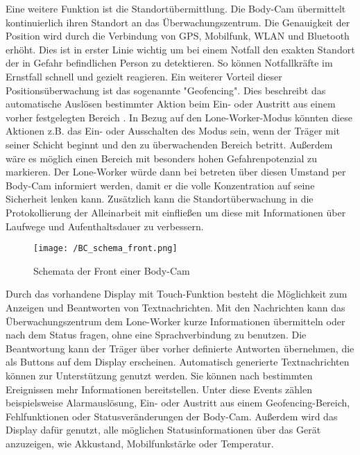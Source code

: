 \documentclass[thesis.tex]{subfiles}
\begin{document}
Eine weitere Funktion ist die Standortübermittlung.
Die Body-Cam übermittelt kontinuierlich ihren Standort an das Überwachungszentrum.
Die Genauigkeit der Position wird durch die Verbindung von GPS, Mobilfunk, WLAN und Bluetooth erhöht.
Dies ist in erster Linie wichtig um bei einem Notfall den exakten Standort der in Gefahr befindlichen Person zu detektieren.
So können Notfallkräfte im Ernstfall schnell und gezielt reagieren.
Ein weiterer Vorteil dieser Positionsüberwachung ist das sogenannte "Geofencing".
Dies beschreibt das automatische Auslösen bestimmter Aktion beim Ein- oder Austritt aus einem vorher festgelegten Bereich \cite[]{geofencing}.
In Bezug auf den Lone-Worker-Modus könnten diese Aktionen z.B. das Ein- oder Ausschalten des Modus sein, wenn der Träger mit seiner Schicht beginnt und den zu überwachenden Bereich betritt.
Außerdem wäre es möglich einen Bereich mit besonders hohen Gefahrenpotenzial zu markieren.
Der Lone-Worker würde dann bei betreten über diesen Umstand per Body-Cam informiert werden, damit er die volle Konzentration auf seine Sicherheit lenken kann.
Zusätzlich kann die Standortüberwachung in die Protokollierung der Alleinarbeit mit einfließen um diese mit Informationen über Laufwege und Aufenthaltsdauer zu verbessern.

\begin{figure}[h]
    \centering
    \texttt{[image: /BC\_schema\_front.png]}
    \caption{Schemata der Front einer Body-Cam}
    \label{fig:BC_schema}
\end{figure}

Durch das vorhandene Display mit Touch-Funktion besteht die Möglichkeit zum Anzeigen und Beantworten von Textnachrichten.
Mit den Nachrichten kann das Überwachungszentrum dem Lone-Worker kurze Informationen übermitteln oder nach dem Status fragen, ohne eine Sprachverbindung zu benutzen.
Die Beantwortung kann der Träger über vorher definierte Antworten übernehmen, die als Buttons auf dem Display erscheinen.
Automatisch generierte Textnachrichten können zur Unterstützung genutzt werden.
Sie können nach bestimmten Ereignissen mehr Informationen bereitstellen.
Unter diese Events zählen beispielsweise Alarmauslösung, Ein- oder Austritt aus einem Geofencing-Bereich, Fehlfunktionen oder Statusveränderungen der Body-Cam.
Außerdem wird das Display dafür genutzt, alle möglichen Statusinformationen über das Gerät anzuzeigen, wie Akkustand, Mobilfunkstärke oder Temperatur.
\end{document}
